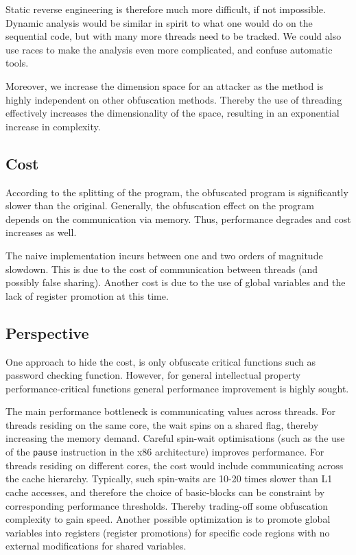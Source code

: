 \documentclass[3p,times,procedia,twocolumn,letterpaper]{elsarticle}
\begin{document}
Static reverse engineering is therefore much more difficult, if not
impossible. Dynamic analysis would be similar in spirit to what one would do on the sequential code, but with many more threads need to be tracked. We could also use races to
make the analysis even more complicated, and confuse automatic tools.

Moreover, we increase the dimension space for an attacker as the method is highly independent on other obfuscation methods. Thereby the use of threading effectively increases the dimensionality of the space, resulting in an exponential increase in complexity.

\subsection{Cost}

According to the splitting of the program, the obfuscated program
is significantly slower than the original. Generally, the obfuscation effect on the program depends on
the communication via memory. Thus, performance degrades
and cost increases as well. 

The naive implementation incurs between one and two orders of magnitude slowdown. This is due to the cost of communication between threads (and possibly false sharing). Another cost is due to the use of global variables and the lack of register promotion at this time.


\subsection{Perspective}

One approach to hide the cost, is only obfuscate critical functions such as password checking function. However, for general intellectual property performance-critical functions general performance improvement is highly sought.

The main performance bottleneck is communicating values across threads. For threads residing on the same core, the wait spins on a shared flag, thereby increasing the memory demand. Careful spin-wait optimisations (such as the use of the \verb!pause! instruction in the x86 architecture) improves performance. For threads residing on different cores, the cost would include communicating across the cache hierarchy. Typically, such spin-waits are 10-20 times slower than L1 cache accesses, and therefore the choice of basic-blocks can be constraint by corresponding  performance thresholds. Thereby trading-off some obfuscation complexity to gain speed. Another possible optimization is to promote global variables into registers (register promotions) for specific code regions with no external modifications for shared variables. 
\end{document}
